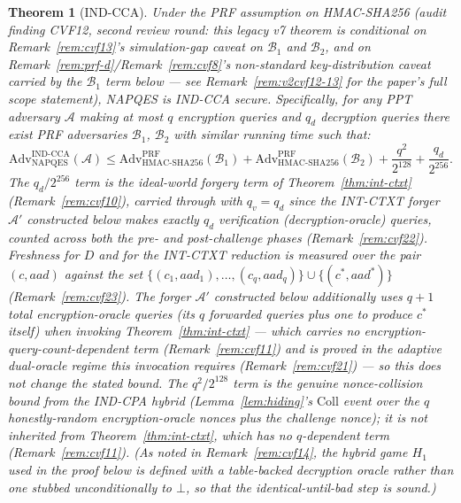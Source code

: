 \documentclass[11pt,a4paper]{article}
\newtheorem{theorem}{Theorem}[section]
\begin{document}
\begin{theorem}[IND-CCA]\label{thm:ind-cca}
  Under the PRF assumption on HMAC-SHA256 (audit finding CVF12, second
  review round: this legacy v7 theorem is conditional on
  Remark~\ref{rem:cvf13}'s simulation-gap caveat on $\mathcal{B}_1$ and
  $\mathcal{B}_2$, and on Remark~\ref{rem:prf-d}/Remark~\ref{rem:cvf8}'s
  non-standard key-distribution caveat carried by the $\mathcal{B}_1$
  term below --- see Remark~\ref{rem:v2cvf12-13} for the paper's full
  scope statement), NAPQES is IND-CCA secure.
  Specifically, for any PPT adversary $\mathcal{A}$ making at most $q$
  encryption queries and $q_d$ decryption queries there exist PRF adversaries
  $\mathcal{B}_1$, $\mathcal{B}_2$ with similar running time such that:
  \[
    \mathrm{Adv}^{\mathrm{IND\text{-}CCA}}_{\mathrm{NAPQES}}(\mathcal{A})
    \leq
    \mathrm{Adv}^{\mathrm{PRF}}_{\mathrm{HMAC\text{-}SHA256}}(\mathcal{B}_1)
    +
    \mathrm{Adv}^{\mathrm{PRF}}_{\mathrm{HMAC\text{-}SHA256}}(\mathcal{B}_2)
    + \frac{q^2}{2^{128}}
    + \frac{q_d}{2^{256}}.
  \]
  The $q_d/2^{256}$ term is the ideal-world forgery term of
  Theorem~\ref{thm:int-ctxt} (Remark~\ref{rem:cvf10}), carried through
  with $q_v = q_d$ since the INT-CTXT forger $\mathcal{A}'$ constructed
  below makes exactly $q_d$ verification (decryption-oracle) queries,
  counted across \emph{both} the pre- and post-challenge phases
  (Remark~\ref{rem:cvf22}). Freshness for $D$ and for the INT-CTXT
  reduction is measured over the pair $(c,aad)$ against the set
  $\{(c_1,aad_1),\ldots,(c_q,aad_q)\}\cup\{(c^*,aad^*)\}$
  (Remark~\ref{rem:cvf23}). The forger $\mathcal{A}'$ constructed below
  additionally uses $q+1$ total encryption-oracle queries (its $q$
  forwarded queries plus one to produce $c^*$ itself) when invoking
  Theorem~\ref{thm:int-ctxt} --- which carries no
  encryption-query-count-dependent term (Remark~\ref{rem:cvf11}) and is
  proved in the adaptive dual-oracle regime this invocation requires
  (Remark~\ref{rem:cvf21}) --- so this does not change the stated bound.
  The $q^2/2^{128}$ term is the genuine nonce-collision bound from the
  IND-CPA hybrid (Lemma~\ref{lem:hiding}'s $\mathrm{Coll}$ event over the
  $q$ honestly-random encryption-oracle nonces plus the challenge nonce);
  it is \emph{not} inherited from Theorem~\ref{thm:int-ctxt}, which has no
  $q$-dependent term (Remark~\ref{rem:cvf11}).
  (As noted in Remark~\ref{rem:cvf14}, the hybrid game $H_1$ used in the
  proof below is defined with a table-backed decryption oracle rather
  than one stubbed unconditionally to $\bot$, so that the
  identical-until-bad step is sound.)
\end{theorem}
\end{document}
